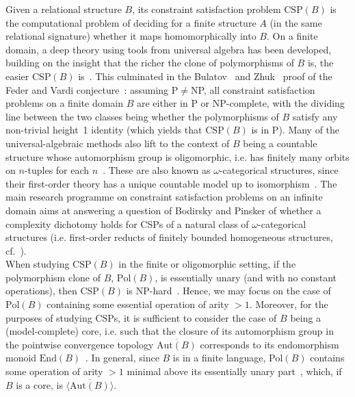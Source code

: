 \documentclass{article}
\theoremstyle{remark}
\theoremstyle{definition}
\begin{document}
 







Given a relational structure $B$, its constraint satisfaction problem $\mathrm{CSP}(B)$ is the computational problem  of deciding for a finite structure $A$ (in the same relational signature) whether it maps homomorphically into $B$. On a finite domain, a deep theory using tools from universal algebra has been  developed, building on the insight that the richer the clone of polymorphisms of $B$ is, the easier  $\mathrm{CSP}(B)$ is~\cite{JBK}. This culminated in the Bulatov~\cite{bulatov2017dichotomy} and Zhuk~\cite{zhuk2020proof} proof of the Feder and Vardi conjecture~\cite{feder1993monotone}: assuming P$\neq$NP, all constraint satisfaction problems on a finite domain $B$ are either in P or NP-complete, with the dividing line between the two classes being whether the polymorphisms of $B$ satisfy any non-trivial height~1 identity (which yields that $\mathrm{CSP}(B)$ is in P). Many of the universal-algebraic methods  also lift to the context of $B$ being a countable structure whose automorphism group is {oligomorphic}, i.e. has finitely many orbits on $n$-tuples for each $n$~\cite{BodCSP}. These are also known as ${\omega}${-categorical} structures, since their first-order theory has a unique countable model up to isomorphism~\cite[Theorem 7.3.1]{fathodges}. The main research programme on constraint satisfaction problems on an infinite domain aims at answering a question of Bodirsky and Pinsker of whether a complexity dichotomy holds for CSPs of a natural class of $\omega$-categorical structures (i.e. first-order reducts of finitely bounded homogeneous structures, cf.~\cite{BPP-projective-homomorphisms,irrelevant,BodCSP, infinitesheep}).\\

When studying $\mathrm{CSP}(B)$ in the finite or oligomorphic setting, if the polymorphism clone of $B$, $\mathrm{Pol}(B)$, is essentially unary (and with no constant operations), then $\mathrm{CSP}(B)$ is NP-hard~\cite{JBK,Topo-Birk}. Hence, we may focus on the case of $\mathrm{Pol}(B)$ containing some essential operation of arity $>1$. Moreover, for the purposes of studying $\mathrm{CSP}$s, it is sufficient to consider the case of $B$ being a (model-complete) {core}, i.e. such that the closure of its automorphism group in the pointwise convergence topology $\overline{\mathrm{Aut}(B)}$ corresponds to its endomorphism monoid $\mathrm{End}(B)$~\cite{bodirsky2007cores}. In general, since $B$ is in a finite language, $\mathrm{Pol}(B)$ contains some  operation of arity $>1$ minimal above its essentially unary part~\cite{BodChen, JBK}, which, if $B$ is a core, is $\overline{\langle\mathrm{Aut}(B)\rangle}$.\\
\end{document}
